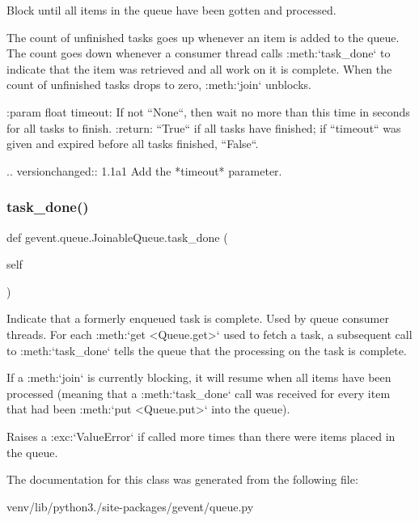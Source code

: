 \begin{DoxyVerb}Block until all items in the queue have been gotten and processed.

The count of unfinished tasks goes up whenever an item is added to the queue.
The count goes down whenever a consumer thread calls :meth:`task_done` to indicate
that the item was retrieved and all work on it is complete. When the count of
unfinished tasks drops to zero, :meth:`join` unblocks.

:param float timeout: If not ``None``, then wait no more than this time in seconds
    for all tasks to finish.
:return: ``True`` if all tasks have finished; if ``timeout`` was given and expired before
    all tasks finished, ``False``.

.. versionchanged:: 1.1a1
   Add the *timeout* parameter.
\end{DoxyVerb}
 \mbox{\label{classgevent_1_1queue_1_1_joinable_queue_aa6f6253b94a3cbd933af41d61fd5d81d}} 
\subsubsection{\texorpdfstring{task\+\_\+done()}{task\_done()}}
{\footnotesize\ttfamily def gevent.\+queue.\+Joinable\+Queue.\+task\+\_\+done (\begin{DoxyParamCaption}\item[{}]{self }\end{DoxyParamCaption})}

\begin{DoxyVerb}Indicate that a formerly enqueued task is complete. Used by queue consumer threads.
For each :meth:`get <Queue.get>` used to fetch a task, a subsequent call to :meth:`task_done` tells the queue
that the processing on the task is complete.

If a :meth:`join` is currently blocking, it will resume when all items have been processed
(meaning that a :meth:`task_done` call was received for every item that had been
:meth:`put <Queue.put>` into the queue).

Raises a :exc:`ValueError` if called more times than there were items placed in the queue.
\end{DoxyVerb}
 

The documentation for this class was generated from the following file\+:\begin{DoxyCompactItemize}
\item 
venv/lib/python3./site-\/packages/gevent/queue.\+py\end{DoxyCompactItemize}
